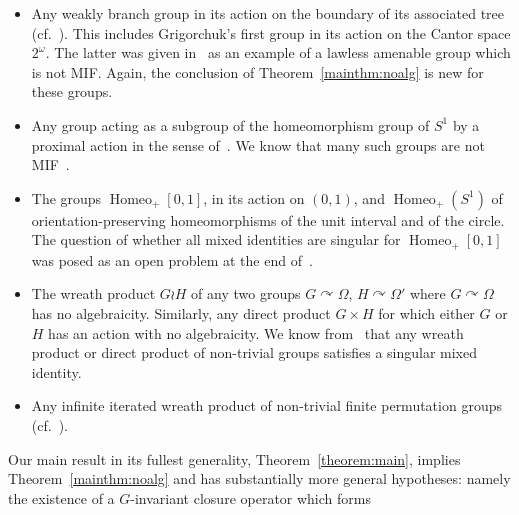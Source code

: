 \documentclass{article}
\theoremstyle{remark}
\theoremstyle{definition}
\def\acts{\curvearrowright}
\DeclareMathOperator{\Homeo}{Homeo}
\begin{document}
\begin{itemize}
\begin{itemize}
\end{itemize}
\item Any weakly branch group in its action on the boundary of its associated tree~\cite{grigorchuk2011some} (cf.~\cite{abert2005group, ivanov2025mixed}). This includes Grigorchuk’s first group in its action on the Cantor space $2^\omega$. The latter %
was given in~\cite{jacobson2021mixed} as an example of a lawless amenable group which is not MIF. Again, the conclusion of Theorem~\ref{mainthm:noalg} is new for these groups. 
\item {Any group acting as a subgroup of {the homeomorphism group of $S^1$}  %
 by a proximal action in the sense of~\cite[p.895]{le2022triple}. We know that many such groups are not MIF~\cite[Proposition 4.7]{le2022triple}.}
\item The groups $\Homeo_+[0,1]$, in its action on $(0,1)$, and $\Homeo_+(S^1)$ of orientation-preserving homeomorphisms of the unit interval and of the circle. The question of whether all mixed identities are singular for $\Homeo_+[0,1]$ {was} %
posed as an open problem at the end of~\cite{bodirsky2024mixed}. 
\item The wreath product $G\wr H$ of any two groups $G\acts\Omega$, $H\acts\Omega'$ where $G\acts\Omega$ has no algebraicity. Similarly, any direct product $G\times H$ for which either $G$ or $H$ has an action with no algebraicity. We know from~\cite{jacobson2021mixed} that any wreath product  or direct product of non-trivial groups satisfies a singular mixed identity.
\item Any infinite iterated wreath product of non-trivial finite permutation groups (cf.~\cite{bhattacharjee1995ubiquity, abert2005group}).
\end{itemize}
Our main result in its fullest generality,  Theorem~\ref{theorem:main}, implies Theorem~\ref{mainthm:noalg} and has substantially more general hypotheses: namely  {the existence of a $G$-invariant closure operator which forms}
\end{document}
